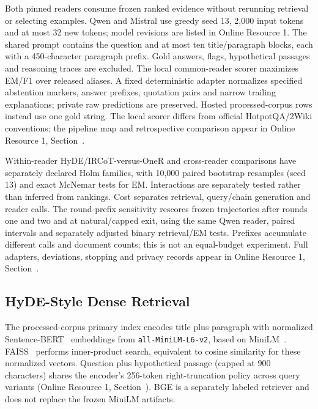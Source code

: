 Both pinned readers consume frozen ranked evidence without rerunning retrieval or selecting examples. Qwen and Mistral use greedy seed 13, 2,000 input tokens and at most 32 new tokens; model revisions are listed in Online Resource 1. The shared prompt contains the question and at most ten title/paragraph blocks, each with a 450-character paragraph prefix. Gold answers, flags, hypothetical passages and reasoning traces are excluded. The local common-reader scorer maximizes EM/F1 over released aliases. A fixed deterministic adapter normalizes specified abstention markers, answer prefixes, quotation pairs and narrow trailing explanations; private raw predictions are preserved. Hosted processed-corpus rows instead use one gold string. The local scorer differs from official HotpotQA/2Wiki conventions; the pipeline map and retrospective comparison appear in Online Resource 1, Section~.

Within-reader HyDE/IRCoT-versus-OneR and cross-reader comparisons have separately declared Holm families, with 10,000 paired bootstrap resamples (seed 13) and exact McNemar tests for EM. Interactions are separately tested rather than inferred from rankings. Cost separates retrieval, query/chain generation and reader calls. The round-prefix sensitivity rescores frozen trajectories after rounds one and two and at natural/capped exit, using the same Qwen reader, paired intervals and separately adjusted binary retrieval/EM tests. Prefixes accumulate different calls and document counts; this is not an equal-budget experiment. Full adapters, deviations, stopping and privacy records appear in Online Resource 1, Section~.

\subsection{HyDE-Style Dense Retrieval}
\label{sec:hyde_retrieval}

The processed-corpus primary index encodes title plus paragraph with normalized Sentence-BERT~\cite{reimers2019sentencebert} embeddings from \texttt{all-MiniLM-L6-v2}, based on MiniLM~\cite{wang2020minilm}. FAISS~\cite{johnson2019billion} performs inner-product search, equivalent to cosine similarity for these normalized vectors. Question plus hypothetical passage (capped at 900 characters) shares the encoder's 256-token right-truncation policy across query variants (Online Resource 1, Section~). BGE is a separately labeled retriever and does not replace the frozen MiniLM artifacts.

